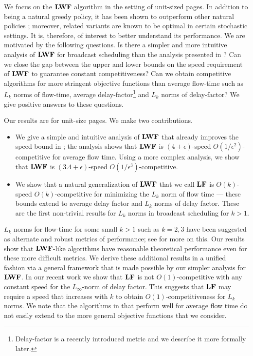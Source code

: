 \documentclass[11pt]{article}
\newcommand{\eps}{\epsilon}
\newcommand{\grdy}{\Algorithm{LF}}
\begin{document}
\begin{titlepage}
We focus on the ${\texttt{\bf{LWF}}}$ algorithm in the setting of unit-sized
pages. In addition to being a natural greedy policy, it has been shown
to outperform other natural policies \cite{AksoyF98}; moreover,
related variants are known to be optimal in certain stochastic
settings.  It is, therefore, of interest to better understand its
performance. We are motivated by the following questions. Is there a
simpler and more intuitive analysis of ${\texttt{\bf{LWF}}}$ for broadcast scheduling
than the analysis presented in \cite{EdmondsP04}?  Can we close the
gap between the upper and lower bounds on the speed requirement of
${\texttt{\bf{LWF}}}$ to guarantee constant competitiveness?  Can we obtain
competitive algorithms for more stringent objective functions than
average flow-time such as $L_k$ norms of flow-time, average
delay-factor\footnote{Delay-factor is a recently introduced metric and
  we describe it more formally later.}  and $L_k$ norms of
delay-factor? We give positive answers to these questions.

\medskip
{} Our results are for unit-size pages. We make two
contributions.
\begin{itemize}
\item We give a simple and intuitive analysis of ${\texttt{\bf{LWF}}}$ that already
  improves the speed bound in \cite{EdmondsP04}; the analysis shows
  that ${\texttt{\bf{LWF}}}$ is $(4+\eps)$-speed $O(1/\epsilon^2)$-competitive for
  average flow time. Using a more complex analysis, we show that
  ${\texttt{\bf{LWF}}}$ is $(3.4+\eps)$-speed $O(1/\epsilon^3)$-competitive.
\item We show that a natural generalization of ${\texttt{\bf{LWF}}}$ that we call
  $\grdy$ is $O(k)$-speed $O(k)$-competitive for minimizing the $L_k$
  norm of flow time --- these bounds extend to average delay
  factor and $L_k$ norms of delay factor. These are the first
  non-trivial results for $L_k$ norms in broadcast scheduling for $k >
  1$.
\end{itemize}
$L_k$ norms for flow-time for some small $k >1$ such as $k=2,3$ have
been suggested as alternate and robust metrics of performance; see
\cite{BansalP03,Pruhs07} for more on this. Our results show that
${\texttt{\bf{LWF}}}$-like algorithms have reasonable theoretical performance even
for these more difficult metrics. We derive these additional results
in a unified fashion via a general framework that is made possible by
our simpler analysis for ${\texttt{\bf{LWF}}}$. In our recent work \cite{ChekuriIM09}
we show that $\grdy$ is not $O(1)$-competitive with any constant speed
for the $L_\infty$-norm of delay factor. This suggests that $\grdy$
may require a speed that increases with $k$ to obtain
$O(1)$-competitiveness for $L_k$ norms. We note that the algorithms in
\cite{EdmondsP03,EdmondsP09} that perform well for average flow time
do not easily extend to the more general objective functions that we
consider.


\end{titlepage}
\end{document}
